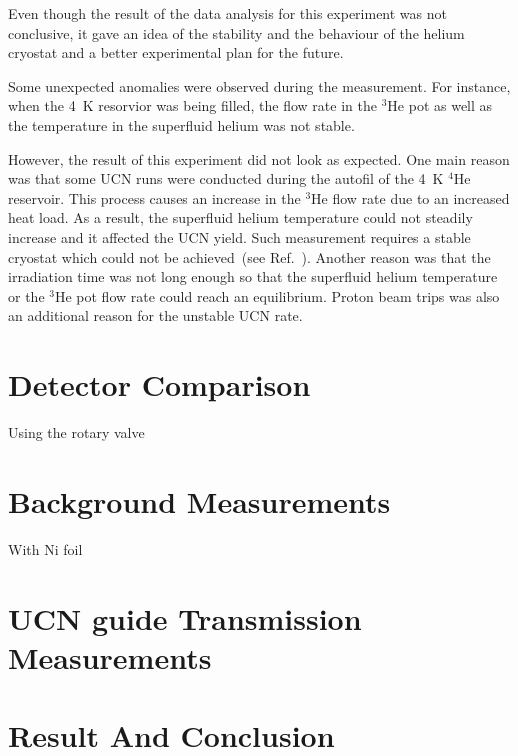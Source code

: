 Even though the result of the data analysis for this experiment was
not conclusive, it gave an idea of the stability and the behaviour of
the helium cryostat and a better experimental plan for the future.

Some unexpected anomalies were observed during the measurement. For
instance, when the 4~K resorvior was being filled, the flow rate in
the $^3$He pot as well as the temperature in the superfluid helium was
not stable. 



 However, the result of
this experiment did not look as expected. One main reason was that
some UCN runs were conducted during the autofil of the 4~K $^4$He
reservoir. This process causes an increase in the $^3$He flow rate due
to an increased heat load. As a result, the superfluid helium
temperature could not steadily increase and it affected the UCN
yield. Such measurement requires a stable cryostat which could not be
achieved~(see Ref.~\cite{UCNreport}). Another reason was that the
irradiation time was not long enough so that the superfluid helium
temperature or the $^3$He pot flow rate could reach an
equilibrium. Proton beam trips was also an additional reason for the
unstable UCN rate.


\section{Detector Comparison\label{sec:detector_comparison}}
Using the rotary valve

\section{Background Measurements}
With Ni foil

\section{UCN guide Transmission Measurements}

\section{Result And Conclusion}

  
  
  
